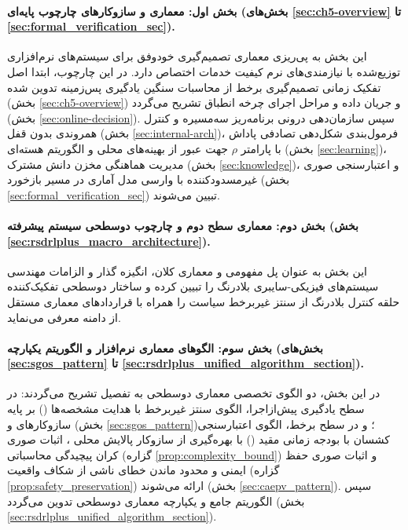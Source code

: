 \documentclass[oneside,openany,phd]{TMU-Thesis}
\begin{document}
\paragraph{بخش اول: معماری و سازوکارهای چارچوب پایه‌ای  (بخش‌های \ref{sec:ch5-overview} تا \ref{sec:formal_verification_sec}).}
این بخش به پی‌ریزی معماری تصمیم‌گیری خودوفق برای سیستم‌های نرم‌افزاری توزیع‌شده با نیازمندی‌های نرم کیفیت خدمات اختصاص دارد. در این چارچوب، ابتدا اصل تفکیک زمانی تصمیم‌گیری برخط از محاسبات سنگین یادگیری پس‌زمینه تدوین شده (بخش \ref{sec:ch5-overview}) و جریان داده و مراحل اجرای چرخه انطباق  تشریح می‌گردد (بخش \ref{sec:online-decision}). سپس سازمان‌دهی درونی برنامه‌ریز سه‌مسیره و کنترل همروندی بدون قفل (بخش \ref{sec:internal-arch})، فرمول‌بندی شکل‌دهی تصادفی پاداش با پارامتر $\rho$ جهت عبور از بهینه‌های محلی و الگوریتم هسته‌ای  (بخش \ref{sec:learning})، مدیریت هماهنگی مخزن دانش مشترک (بخش \ref{sec:knowledge})، و اعتبارسنجی صوری غیرمسدودکننده با وارسی مدل آماری در مسیر بازخورد (بخش \ref{sec:formal_verification_sec}) تبیین می‌شوند.

\paragraph{بخش دوم: معماری سطح دوم و چارچوب دوسطحی سیستم پیشرفته \texorpdfstring{\rsdrlplus}{RS-DRL+} (بخش \ref{sec:rsdrlplus_macro_architecture}).}
این بخش به عنوان پل مفهومی و معماری کلان، انگیزه گذار و الزامات مهندسی سیستم‌های فیزیکی-سایبری بلادرنگ را تبیین کرده و ساختار دوسطحی تفکیک‌کننده حلقه کنترل بلادرنگ از سنتز غیربرخط سیاست را همراه با قراردادهای معماری مستقل از دامنه معرفی می‌نماید.

\paragraph{بخش سوم: الگوهای معماری نرم‌افزار و الگوریتم یکپارچه (بخش‌های \ref{sec:sgos_pattern} تا \ref{sec:rsdrlplus_unified_algorithm_section}).}
در این بخش، دو الگوی تخصصی معماری دوسطحی به تفصیل تشریح می‌گردند: در سطح یادگیری پیش‌ازاجرا، الگوی سنتز غیربرخط با هدایت مشخصه‌ها (\sgos) بر پایه سازوکارهای \mursdrl و \cmrsdrl (بخش \ref{sec:sgos_pattern})؛ و در سطح برخط، الگوی اعتبارسنجی کشسان با بودجه زمانی مقید (\caepv) با بهره‌گیری از سازوکار پالایش محلی \pgalr، اثبات صوری کران پیچیدگی محاسباتی (گزاره \ref{prop:complexity_bound}) و اثبات صوری حفظ ایمنی و محدود ماندن خطای ناشی از شکاف واقعیت (گزاره \ref{prop:safety_preservation}) ارائه می‌شوند (بخش \ref{sec:caepv_pattern}). سپس الگوریتم جامع و یکپارچه معماری دوسطحی تدوین می‌گردد (بخش \ref{sec:rsdrlplus_unified_algorithm_section}).
\end{document}

